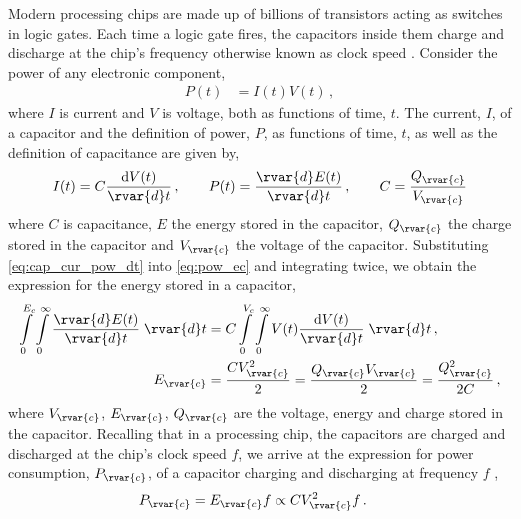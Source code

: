 Modern processing chips are made up of billions of transistors acting as switches in logic gates. Each time a logic gate fires, the capacitors inside them charge and discharge at the chip's frequency otherwise known as clock speed \cite{cpu_trnstor}. Consider the power of any electronic component,
\begin{align}\label{eq:pow_ec}
    P(t) & = I(t) V(t) \,,
\end{align}
where $ I $ is current and $ V $ is voltage, both as functions of time, $t$. The current, $ I $, of a capacitor and the definition of power, $ P $, as functions of time, $ t $, as well as the definition of capacitance are given by,
\begin{align}\label{eq:cap_cur_pow_dt}
    I(t) = C \dfrac{\mathrm{d}V(t)}{\rvar{d}t} \,, \qquad
    P(t) = \dfrac{\rvar{d}E(t)}{\rvar{d}t}\,, \qquad
    C = \dfrac{Q_\rvar{c}}{V_\rvar{c}}
\end{align}
where $ C $ is capacitance, $ E $ the energy stored in the capacitor, $Q_\rvar{c}$ the charge stored in the capacitor and $V_\rvar{c}$ the voltage of the capacitor. Substituting \cref{eq:cap_cur_pow_dt} into \cref{eq:pow_ec} and integrating twice, we obtain the expression for the energy stored in a capacitor,
\begin{subequations}
    \begin{align}\label{eq:e_cap}
        \int\limits_{0}^{E_{c}}\int\limits_{0}^{\infty} \dfrac{\rvar{d}E(t)}{\rvar{d}t}\; \rvar{d} t & = C \int\limits_{0}^{V_{c}}\int\limits_{0}^{\infty} V(t) \dfrac{\mathrm{d}V(t)}{\rvar{d}t}\; \rvar{d} t\,, \\
        E_{\rvar{c}}                                                                                 & = \dfrac{C V_{\rvar{c}}^{2}}{2}  = \dfrac{Q_\rvar{c} V_\rvar{c}}{2} = \dfrac{Q_\rvar{c}^2}{2C}\,,
    \end{align}
\end{subequations}
where $ V_{\rvar{c}} $, $ E_{\rvar{c}} $, $Q_\rvar{c}$ are the voltage, energy and charge stored in the capacitor. Recalling that in a processing chip, the capacitors are charged and discharged at the chip's clock speed $ f $, we arrive at the expression for power consumption, $ P_{\rvar{c}} $, of a capacitor charging and discharging at frequency $ f $ \cite{microelec},
\begin{align}
    P_{\rvar{c}} & = E_{\rvar{c}} f \propto C V_{\rvar{c}}^{2} f \label{eq:p_cap}\,.
\end{align}

